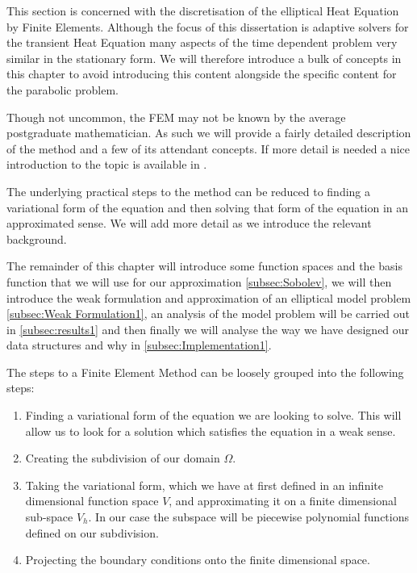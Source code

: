 \documentclass{uonmathreport}
\theoremstyle{definition}
\theoremstyle{problem}
\theoremstyle{theorem}
\begin{document}
This section is concerned with the discretisation of the elliptical Heat Equation by Finite Elements. Although the focus of this dissertation is adaptive solvers for the transient Heat Equation many aspects of the time dependent problem very similar in the stationary form. We will therefore introduce a bulk of concepts in this chapter to avoid introducing this content alongside the specific content for the parabolic problem.  

Though not uncommon, the FEM may not be known by the average postgraduate mathematician. As such we will provide a fairly detailed description of the method and a few of its attendant concepts. If more detail is needed a nice introduction to the topic is available in \cite{larson2013finite}.

The underlying practical steps to the method can be reduced to finding a variational form of the equation and then solving that form of the equation in an approximated sense. We will add more detail as we introduce the relevant background.

The remainder of this chapter will introduce some function spaces and the basis function that we will use for our approximation \ref{subsec:Sobolev}, we will then introduce the weak formulation and approximation of an elliptical model problem \ref{subsec:Weak Formulation1}, an analysis of the model problem will be carried out in \ref{subsec:results1} and then finally we will analyse the way we have designed our data structures and why in \ref{subsec:Implementation1}.

The steps to a Finite Element Method can be loosely grouped into the following steps:

\begin{enumerate}
\item Finding a variational form of the equation we are looking to solve. This will allow us to look for a solution which satisfies the equation in a weak sense. 

\item Creating the subdivision of our domain $\Omega$.

\item Taking the variational form, which we have at first defined in an infinite dimensional function space $V$, and approximating it on a finite dimensional sub-space $V_{h}$. In our case the subspace will be piecewise polynomial functions defined on our subdivision.

\item Projecting the boundary conditions onto the finite dimensional space.
\end{enumerate}
\end{document}
